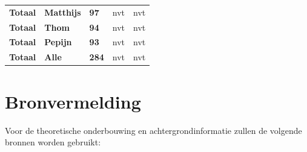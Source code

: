 \documentclass[a4paper,12pt]{article}
\begin{document}
\begin{tabular}{|>{\raggedright}m{6cm}|>{\raggedright}m{2.3cm}|>{\raggedright}m{1.4cm}|>{\raggedright}m{2.3cm}|>{\raggedright\arraybackslash}m{2cm}|}
    \textbf{Totaal}                    & \textbf{Matthijs} & \textbf{97}     & nvt                 & nvt               \\
    \textbf{Totaal}                    & \textbf{Thom}     & \textbf{94}     & nvt                 & nvt               \\
    \textbf{Totaal}                    & \textbf{Pepijn}   & \textbf{93}     & nvt                 & nvt               \\
    \hline

    \textbf{Totaal}                    & \textbf{Alle}     & \textbf{284}    & nvt                 & nvt               \\

    \hline

\end{tabular}
\section{Bronvermelding}
Voor de theoretische onderbouwing en achtergrondinformatie zullen de volgende
bronnen worden gebruikt:
\end{document}

